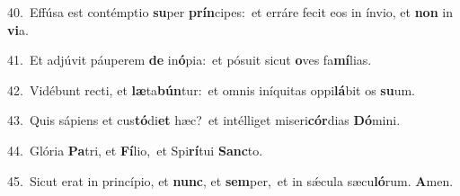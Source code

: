 {\numbfont\textcolor{\numbcolor}{40.}}~Effúsa est contémptio \textbf{su}\-per \textbf{prín}\-cipes:~\star et erráre fecit eos in ínvio, et \textbf{non} in \textbf{vi}\-a.\par
{\numbfont\textcolor{\numbcolor}{41.}}~Et adjúvit páuperem \textbf{de} in\-\textbf{ó}\-pia:~\star et pósuit sicut \textbf{o}\-ves fa\-\textbf{mí}\-lias.\par
{\numbfont\textcolor{\numbcolor}{42.}}~Vidébunt recti, et \textbf{læ}\-ta\-\textbf{bún}\-tur:~\star et omnis iníquitas oppi\-\textbf{lá}\-bit os \textbf{su}\-um.\par
{\numbfont\textcolor{\numbcolor}{43.}}~Quis sápiens et cus\-\textbf{tó}\-di\textbf{et} hæc?~\star et intélliget miseri\-\textbf{cór}\-dias \textbf{Dó}\-mini.\par
{\numbfont\textcolor{\numbcolor}{44.}}~Glória \textbf{Pa}\-tri, et \textbf{Fí}\-lio,~\star et Spi\-\textbf{rí}\-tui \textbf{Sanc}\-to.\par
{\numbfont\textcolor{\numbcolor}{45.}}~Sicut erat in princípio, et \textbf{nunc}\-, et \textbf{sem}\-per,~\star et in sǽcula sæcu\-\textbf{ló}\-rum. \textbf{A}\-men.\par
